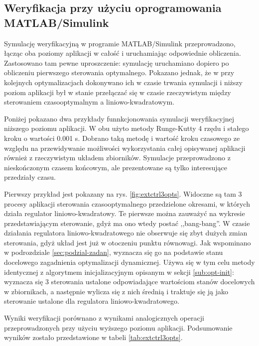 \subsection{Weryfikacja przy użyciu oprogramowania MATLAB/Simulink}
\label{sub:sym-wer-matlab}


Symulację weryfikacyjną w programie MATLAB/Simulink przeprowadzono, łącząc oba poziomy aplikacji w całość i uruchamiając odpowiednie obliczenia. Zastosowano tam pewne uproszczenie: symulację uruchamiano dopiero po obliczeniu pierwszego sterowania optymalnego. Pokazano jednak, że w przy kolejnych optymalizacjach dokonywano ich w czasie trwania symulacji i niższy poziom aplikacji był w stanie przełączać się w czasie rzeczywistym między sterowaniem czasooptymalnym a liniowo-kwadratowym.

Poniżej pokazano dwa przykłady funnkcjonowania symulacji weryfikacyjnej niższego poziomu aplikacji.
W obu użyto metody Runge-Kutty 4 rzędu i stałego kroku o wartości 0.001 s. Dobrano taką metodę i wartość kroku czasowego ze względu na przewidywanie możliwości wykorzystania całej opisywanej aplikacji również z rzeczywistym układem zbiorników.
Symulacje przeprowadzono z nieskończonym czasem końcowym, ale prezentowane są tylko interesujące przedziały czasu.

Pierwszy przykład jest pokazany na rys. \ref{fig:extctrl3opts}. Widoczne są tam 3 procesy aplikacji sterowania czasooptymalnego przedzielone okresami, w których działa regulator liniowo-kwadratowy. Te pierwsze można zauważyć na wykresie przedstawiającym sterowanie, gdyż ma ono wtedy postać ,,bang-bang''. W czasie działania regulatora liniowo-kwadratowego nie obserwuje się zbyt dużych zmian sterowania, gdyż układ jest już w otoczeniu punktu równowagi.
Jak wspominano w podrozdziale \ref{sec:podzial-zadan}, wyznacza się go na podstawie stanu docelowego zagadnienia optymalizacji dynamicznej. Używa się w tym celu metody identycznej z algorytmem inicjalizacyjnym opisanym w sekcji \ref{sub:opt-init}: wyznacza się 3 sterowania ustalone odpowiadające wartościom stanów docelowych w zbiornikach, a następnie wylicza się z nich średnią i traktuje się ją jako sterowanie ustalone dla regulatora liniowo-kwadratowego.

Wyniki weryfikacji porównano z wynikami analogicznych operacji przeprowadzonych przy użyciu wyższego poziomu aplikacji. Podsumowanie wyników zostało przedstawione w tabeli \ref{tab:extctrl3opts}.

